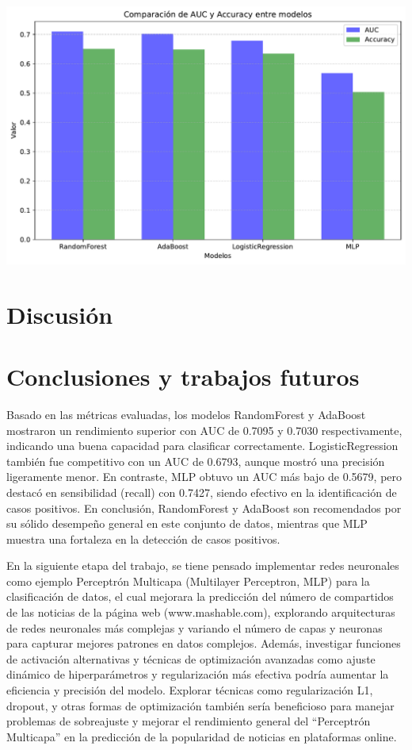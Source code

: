 \documentclass[
  number,
  preprint,
  3p,
  twocolumn]{elsarticle}
\begin{document}
\includegraphics{Articulo_v2_files/figure-pdf/cell-9-output-1.pdf}

\section{Discusión}\label{discusiuxf3n}

\section{Conclusiones y trabajos
futuros}\label{conclusiones-y-trabajos-futuros}

Basado en las métricas evaluadas, los modelos RandomForest y AdaBoost
mostraron un rendimiento superior con AUC de 0.7095 y 0.7030
respectivamente, indicando una buena capacidad para clasificar
correctamente. LogisticRegression también fue competitivo con un AUC de
0.6793, aunque mostró una precisión ligeramente menor. En contraste, MLP
obtuvo un AUC más bajo de 0.5679, pero destacó en sensibilidad (recall)
con 0.7427, siendo efectivo en la identificación de casos positivos. En
conclusión, RandomForest y AdaBoost son recomendados por su sólido
desempeño general en este conjunto de datos, mientras que MLP muestra
una fortaleza en la detección de casos positivos.

En la siguiente etapa del trabajo, se tiene pensado implementar redes
neuronales como ejemplo Perceptrón Multicapa (Multilayer Perceptron,
MLP) para la clasificación de datos, el cual mejorara la predicción del
número de compartidos de las noticias de la página web
(www.mashable.com), explorando arquitecturas de redes neuronales más
complejas y variando el número de capas y neuronas para capturar mejores
patrones en datos complejos. Además, investigar funciones de activación
alternativas y técnicas de optimización avanzadas como ajuste dinámico
de hiperparámetros y regularización más efectiva podría aumentar la
eficiencia y precisión del modelo. Explorar técnicas como regularización
L1, dropout, y otras formas de optimización también sería beneficioso
para manejar problemas de sobreajuste y mejorar el rendimiento general
del ``Perceptrón Multicapa'' en la predicción de la popularidad de
noticias en plataformas online.


\renewcommand\refname{References}
  
\end{document}
